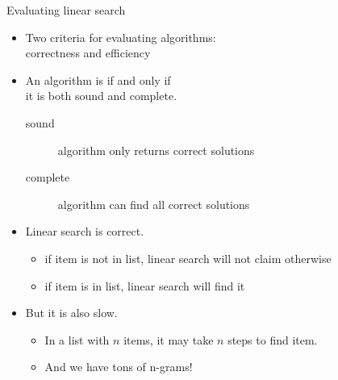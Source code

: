 \documentclass[professionalfonts, xcolor={usenames,svgnames,x11names,table}]{beamer}
\begin{document}
\begin{frame}{Evaluating linear search}
    \begin{itemize}
        \item Two criteria for evaluating algorithms:\\
            correctness and efficiency
        \item An algorithm is  if and only if\\
              it is both sound and complete.
            \begin{description}
                \item[sound] algorithm only returns correct solutions
                \item[complete] algorithm can find all correct solutions
            \end{description}
        \item Linear search is correct.
                \begin{itemize}
                    \item if item is not in list, linear search will not claim otherwise
                    \item if item is in list, linear search will find it
                \end{itemize}
        \item But it is also slow.
                \begin{itemize}
                    \item In a list with $n$ items, it may take $n$ steps to find item.
                    \item And we have tons of n-grams!
                \end{itemize}
    \end{itemize}
\end{frame}
\end{document}

